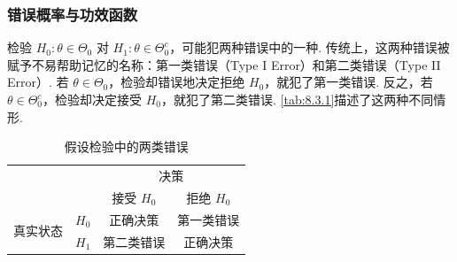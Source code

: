 \subsubsection{错误概率与功效函数}\label{sec:8.3.1}
检验 $H_0:\theta\in\Theta_0$ 对 $H_1:\theta\in\Theta_0^c$，可能犯两种错误中的一种. 传统上，这两种错误被赋予不易帮助记忆的名称：第一类错误（Type I Error）和第二类错误（Type II Error\mbox{）.} 若 $\theta\in\Theta_0$，检验却错误地决定拒绝 $H_0$，就犯了第一类错误. 反之，若 $\theta\in\Theta_0^c$，检验却决定接受 $H_0$，就犯了第二类错误. \autoref{tab:8.3.1}描述了这两种不同情形.

\begin{table}[htbp]\centering
\caption{假设检验中的两类错误}\label{tab:8.3.1}
\begin{tabular}{cc|cc}\toprule
&&\multicolumn{2}{c}{决策}\\
&&接受 $H_0$&拒绝 $H_0$\\\midrule
\multirow{2}{*}{真实状态}&$H_0$&正确决策&第一类错误\\
&$H_1$&第二类错误&正确决策\\\bottomrule
\end{tabular}
\end{table}

